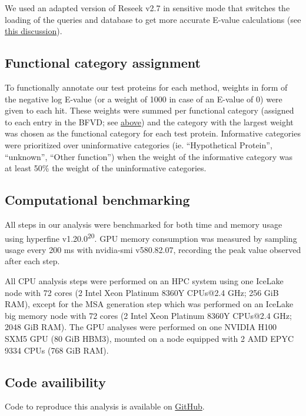 \documentclass[
  sn-nature,
]{sn-jnl}
\begin{document}
We used an adapted version of Reseek v2.7 in sensitive mode that
switches the loading of the queries and database to get more accurate
E-value calculations (see
\href{https://github.com/rcedgar/reseek/issues/18}{this discussion}).

\subsection{Functional category
assignment}\label{functional-category-assignment}

To functionally annotate our test proteins for each method, weights in
form of the negative log E-value (or a weight of 1000 in case of an
E-value of 0) were given to each hit. These weights were summed per
functional category (assigned to each entry in the BFVD; see
\hyperref[functional-classifier]{above}) and the category with the
largest weight was chosen as the functional category for each test
protein. Informative categories were prioritized over uninformative
categories (ie. ``Hypothetical Protein'', ``unknown'', ``Other
function'') when the weight of the informative category was at least
50\% the weight of the uninformative categories.

\subsection{Computational
benchmarking}\label{computational-benchmarking-1}

All steps in our analysis were benchmarked for both time and memory
usage using hyperfine v1.20.0\textsuperscript{20}. GPU memory
consumption was measured by sampling usage every 200 ms with nvidia-smi
v580.82.07, recording the peak value observed after each step.

All CPU analysis steps were performed on an HPC system using one IceLake
node with 72 cores (2 Intel Xeon Platinum 8360Y CPUs@2.4 GHz; 256 GiB
RAM), except for the MSA generation step which was performed on an
IceLake big memory node with 72 cores (2 Intel Xeon Platinum 8360Y
CPUs@2.4 GHz; 2048 GiB RAM). The GPU analyses were performed on one
NVIDIA H100 SXM5 GPU (80 GiB HBM3), mounted on a node equipped with 2
AMD EPYC 9334 CPUs (768 GiB RAM).

\subsection{Code availibility}\label{code-availibility}

Code to reproduce this analysis is available on
\href{https://github.com/LanderDC/annotation_benchmark/}{GitHub}.
\end{document}
